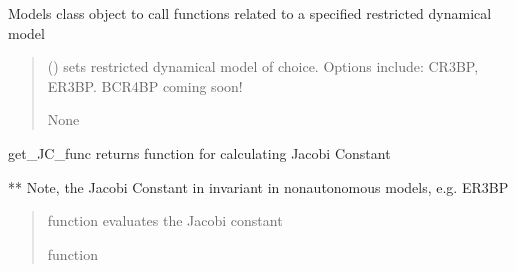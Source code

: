 \documentclass[letterpaper,10pt,english]{sphinxmanual}
\begin{document}
\begin{fulllineitems}
\label{\detokenize{models:pyraa.models.Models}}
\pysigstartsignatures
{}
\pysigstopsignatures
\sphinxAtStartPar
Models \sphinxhyphen{} class object to call functions related to a specified
restricted dynamical model
\begin{quote}\begin{description}
\sphinxAtStartPar
{} (\sphinxstyleliteralemphasis{\sphinxupquote{, }}) \sphinxhyphen{}\sphinxhyphen{} sets restricted dynamical model of choice.
Options include: \textquotesingle{}CR3BP\textquotesingle{}, \textquotesingle{}ER3BP\textquotesingle{}.
\textquotesingle{}BCR4BP\textquotesingle{} coming soon!

\sphinxAtStartPar
None

\end{description}\end{quote}

\begin{fulllineitems}
\label{\detokenize{models:pyraa.models.Models.get_JC_func}}
\pysigstartsignatures
{}
\pysigstopsignatures
\sphinxAtStartPar
get\_JC\_func \sphinxhyphen{} returns function for calculating Jacobi Constant

\sphinxAtStartPar
** Note, the Jacobi Constant in  invariant in
non\sphinxhyphen{}autonomous models, e.g. \textquotesingle{}ER3BP\textquotesingle{}
\begin{quote}\begin{description}
\sphinxAtStartPar
{} \sphinxhyphen{}\sphinxhyphen{} 

\sphinxAtStartPar
{} \sphinxhyphen{}\sphinxhyphen{} function evaluates the Jacobi constant

\sphinxAtStartPar
function


\end{description}
\end{quote}
\end{fulllineitems}
\end{fulllineitems}
\end{document}
